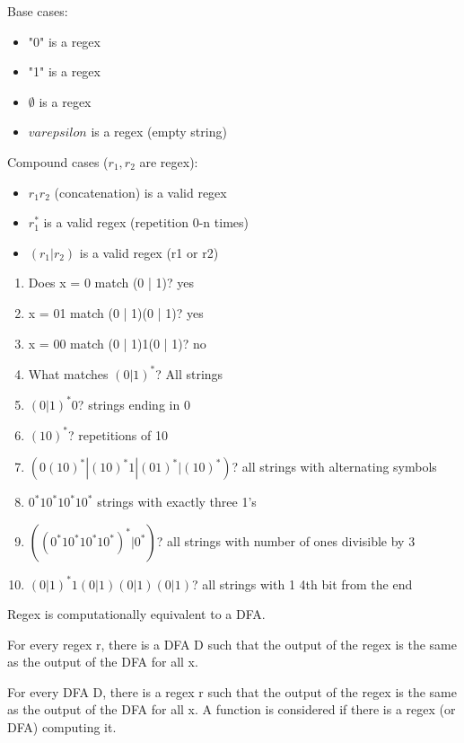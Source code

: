 \begin{definition}
    
    Base cases:
    \begin{itemize}
        \item "0" is a regex
        \item "1" is a regex
        \item $\emptyset$ is a regex
        \item $varepsilon$ is a regex (empty string)
    \end{itemize}

    Compound cases ($r_1, r_2$ are regex):
    \begin{itemize}
        \item $r_1r_2$ (concatenation) is a valid regex
        \item $r_1^*$ is a valid regex (repetition 0-n times)
        \item $(r_1 | r_2)$ is a valid regex (r1 or r2)
    \end{itemize}
\end{definition}

\begin{example}
    \begin{enumerate}
        \item Does x = 0 match (0 | 1)? yes
        \item x = 01 match (0 | 1)(0 | 1)? yes
        \item x = 00 match (0 | 1)1(0 | 1)? no
        \item What matches $(0 | 1)^*$? All strings
        \item $(0 | 1)^*0$? strings ending in 0
        \item $(10)^*$? repetitions of 10
        \item $(0(10)^* | (10)^*1 | (01)^* | (10)^*)$? all strings with alternating symbols
        \item $0^*10^*10^*10^*$ strings with exactly three 1's
        \item $((0^*10^*10^*10^*)^* | 0^*)$? all strings with number of ones divisible by 3
        \item $(0 | 1)^* 1 (0|1)(0|1)(0|1)$? all strings with 1 4th bit from the end
    \end{enumerate}
\end{example}

\begin{theorem}
    Regex is computationally equivalent to a DFA.

    For every regex r, there is a DFA D such that the output of the regex is the same as the output of the DFA for all x. 

    For every DFA D, there is a regex r such that the output of the regex is the same as the output of the DFA for all x. A function is considered  if there is a regex (or DFA) computing it.
\end{theorem}

